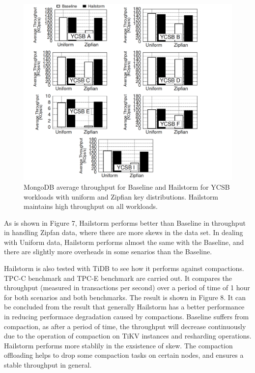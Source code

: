 \documentclass[a4paper,10pt,twoside]{article}
\begin{document}
\begin{figure}[h]
    \centering
	\includegraphics[scale=0.3]{YCSB_throughput.png}
    \caption{MongoDB average throughput for Baseline and Hailstorm
	for YCSB workloads with uniform and Zipfian key distributions.
	Hailstorm maintains high throughput on all workloads.}
    \label{fig:mesh1}
\end{figure}
As is shown in Figure 7, Hailstorm performs better than Baseline in throughput in handling Zipfan data, where there are more skews in the data set.
In dealing with Uniform data, Hailstorm performs almost the same with the Baseline, and there are slightly more overheads in some senarios than the Baseline.
\par
Hailstorm is also tested with TiDB to see how it performs against compactions.
TPC-C\cite{10.1145/369275.369291} benchmark and TPC-E\cite{10.1145/1942776.1942778} benchmark are carried out.
It compares the throughput (measured in transactions per second) over a period of time of 1 hour for both scenarios and both benchmarks. 
The result is shown in Figure 8.
It can be concluded from the result that generally Hailstorm has a better performance in reducing performace degradation caused by compactions.
Baseline suffers from compaction, as after a period of time, the throughput will decrease continuously due to the operation of compaction on TiKV instances and resharding operations.
Hailstorm performs more stablily in the exsistence of skew. 
The compaction offloading helps to drop some compaction tasks on certain nodes, and ensures a stable throughput in general.
\end{document}
